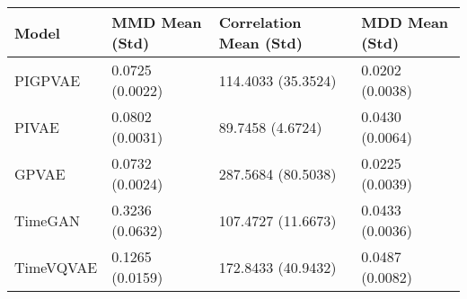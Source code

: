 \begin{tabular}{llll}
\toprule
Model & MMD Mean (Std) & Correlation Mean (Std) & MDD Mean (Std) \\
\midrule
PIGPVAE & 0.0725 (0.0022) & 114.4033 (35.3524) & 0.0202 (0.0038) \\
PIVAE & 0.0802 (0.0031) & 89.7458 (4.6724) & 0.0430 (0.0064) \\
GPVAE & 0.0732 (0.0024) & 287.5684 (80.5038) & 0.0225 (0.0039) \\
TimeGAN & 0.3236 (0.0632) & 107.4727 (11.6673) & 0.0433 (0.0036) \\
TimeVQVAE & 0.1265 (0.0159) & 172.8433 (40.9432) & 0.0487 (0.0082) \\
\bottomrule
\end{tabular}
